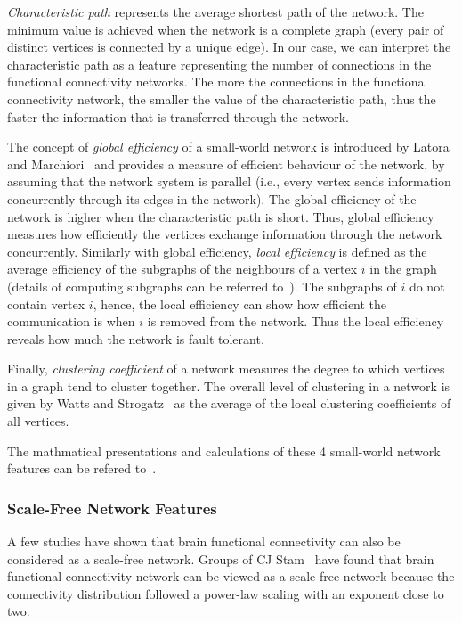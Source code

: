 \emph{Characteristic path} represents the average shortest path of the network. The minimum value is achieved when the network is a complete graph (every pair of distinct vertices is connected by a unique edge). In our case, we can interpret the characteristic path as a feature representing the number of connections in the functional connectivity networks. The more the connections in the functional connectivity network, the smaller the value of the characteristic path, thus the faster the information that is transferred through the network. 

The concept of \emph{global efficiency} of a small-world network is introduced by Latora and Marchiori~\cite{latora2001efficient} and provides a measure of efficient behaviour of the network, by assuming that the network system is parallel (i.e., every vertex sends information concurrently through its edges in the network). The global efficiency of the network is higher when the characteristic path is short. Thus, global efficiency measures how efficiently the vertices exchange information through the network concurrently. Similarly with global efficiency, \emph{local efficiency} is defined as the average efficiency of the subgraphs of the neighbours of a vertex $i$ in the graph (details of computing subgraphs can be referred to~\cite{ullmann1976algorithm}). The subgraphs of $i$ do not contain vertex $i$, hence, the local efficiency can show how efficient the communication is when $i$ is removed from the network. Thus the local efficiency reveals how much the network is fault tolerant. 

Finally, \emph{clustering coefficient} of a network measures the degree to which vertices in a graph tend to cluster together. The overall level of clustering in a network is given by Watts and Strogatz~\cite{watts1998collective} as the average of the local clustering coefficients of all vertices. 

The mathmatical presentations and calculations of these 4 small-world network features can be refered to~\cite{rubinov2010complex}.

\subsubsection{Scale-Free Network Features}
A few studies have shown that brain functional connectivity can also be considered as a scale-free network. Groups of CJ Stam~\cite{stam2004functional} have found that brain functional connectivity network can be viewed as a scale-free network because the connectivity distribution followed a power-law scaling with an exponent close to two.

